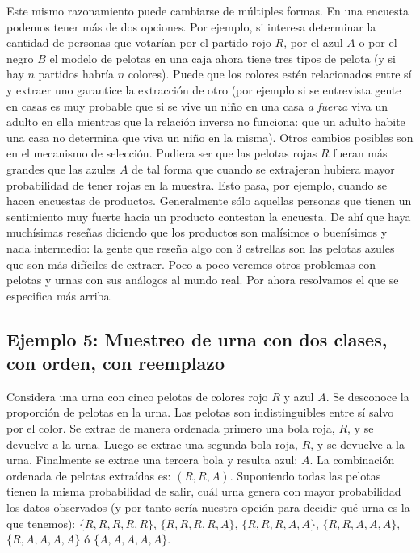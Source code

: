 \documentclass[
]{book}
\begin{document}
Este mismo razonamiento puede cambiarse de múltiples formas. En una encuesta podemos tener más de dos opciones. Por ejemplo, si interesa determinar la cantidad de personas que votarían por el partido rojo \(R\), por el azul \(A\) o por el negro \(B\) el modelo de pelotas en una caja ahora tiene tres tipos de pelota (y si hay \(n\) partidos habría \(n\) colores). Puede que los colores estén relacionados entre sí y extraer uno garantice la extracción de otro (por ejemplo si se entrevista gente en casas es muy probable que si se vive un niño en una casa \emph{a fuerza} viva un adulto en ella mientras que la relación inversa no funciona: que un adulto habite una casa no determina que viva un niño en la misma). Otros cambios posibles son en el mecanismo de selección. Pudiera ser que las pelotas rojas \(R\) fueran más grandes que las azules \(A\) de tal forma que cuando se extrajeran hubiera mayor probabilidad de tener rojas en la muestra. Esto pasa, por ejemplo, cuando se hacen encuestas de productos. Generalmente sólo aquellas personas que tienen un sentimiento muy fuerte hacia un producto contestan la encuesta. De ahí que haya muchísimas reseñas diciendo que los productos son malísimos o buenísimos y nada intermedio: la gente que reseña algo con 3 estrellas son las pelotas azules que son más difíciles de extraer. Poco a poco veremos otros problemas con pelotas y urnas con sus análogos al mundo real. Por ahora resolvamos el que se especifica más arriba.

\hypertarget{ejemplo-5-muestreo-de-urna-con-dos-clases-con-orden-con-reemplazo}{%
\subsection{Ejemplo 5: Muestreo de urna con dos clases, con orden, con reemplazo}\label{ejemplo-5-muestreo-de-urna-con-dos-clases-con-orden-con-reemplazo}}

Considera una urna con cinco pelotas de colores rojo \(R\) y azul \(A\). Se desconoce la proporción de pelotas en la urna. Las pelotas son indistinguibles entre sí salvo por el color. Se extrae de manera ordenada primero una bola roja, \(R\), y se devuelve a la urna. Luego se extrae una segunda bola roja, \(R\), y se devuelve a la urna. Finalmente se extrae una tercera bola y resulta azul: \(A\). La combinación ordenada de pelotas extraídas es: \(( R, R, A)\). Suponiendo todas las pelotas tienen la misma probabilidad de salir, cuál urna genera con mayor probabilidad los datos observados (y por tanto sería nuestra opción para decidir qué urna es la que tenemos): \(\{ R, R, R, R, R\}\), \(\{ R, R, R, R, A\}\), \(\{ R, R, R, A, A\}\), \(\{ R, R, A, A, A\}\), \(\{ R, A, A, A, A\}\) ó \(\{ A, A, A, A, A\}\).
\end{document}
